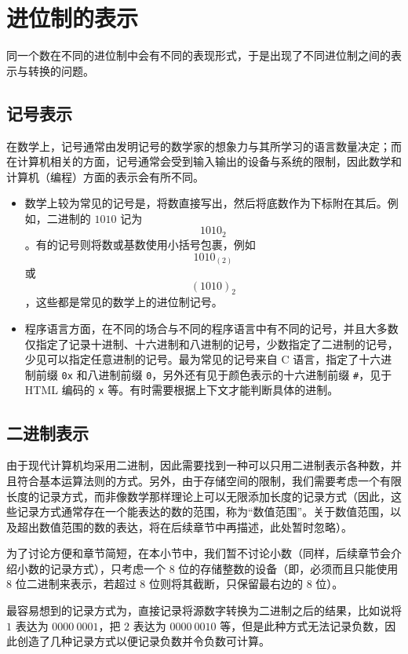 \section{进位制的表示}\label{sec:NumberSystemBasics/positional-notation-presentation}
    同一个数在不同的进位制中会有不同的表现形式，于是出现了不同进位制之间的表示与转换的问题。
    \subsection{记号表示}\label{subsec:NumberSystemBasics/positional-notation-presentation/natural}
        在数学上，记号通常由发明记号的数学家的想象力与其所学习的语言数量决定；而在计算机相关的方面，记号通常会受到输入输出的设备与系统的限制，因此数学和计算机（编程）方面的表示会有所不同。
        \begin{itemize}
            \item 数学上较为常见的记号是，将数直接写出，然后将底数作为下标附在其后。例如，二进制的 $1010$ 记为\[1010_2\]。有的记号则将数或基数使用小括号包裹，例如\[1010_{(2)}\]或\[(1010)_2\]，这些都是常见的数学上的进位制记号。
            \item 程序语言方面，在不同的场合与不同的程序语言中有不同的记号，并且大多数仅指定了记录十进制、十六进制和八进制的记号，少数指定了二进制的记号，少见可以指定任意进制的记号。最为常见的记号来自 C 语言，指定了十六进制前缀 \texttt{0x} 和八进制前缀 \texttt{0}，另外还有见于颜色表示的十六进制前缀 \texttt{\#}，见于 HTML 编码的 \texttt{x} 等。有时需要根据上下文才能判断具体的进制。
        \end{itemize}
    \subsection{二进制表示}\label{subsec:NumberSystemBasics/positional-notation-presentation/binary}
        由于现代计算机均采用二进制，因此需要找到一种可以只用二进制表示各种数，并且符合基本运算法则的方式。另外，由于存储空间的限制，我们需要考虑一个有限长度的记录方式，而非像数学那样理论上可以无限添加长度的记录方式（因此，这些记录方式通常存在一个能表达的数的范围，称为“数值范围”。关于数值范围，以及超出数值范围的数的表达，将在后续章节中再描述，此处暂时忽略）。

        为了讨论方便和章节简短，在本小节中，我们暂不讨论小数（同样，后续章节会介绍小数的记录方式），只考虑一个 $8$ 位的存储整数的设备（即，必须而且只能使用 $8$ 位二进制来表示，若超过 $8$ 位则将其截断，只保留最右边的 $8$ 位）。

        最容易想到的记录方式为，直接记录将源数字转换为二进制之后的结果，比如说将 $1$ 表达为 $0000\ 0001$，把 $2$ 表达为 $0000\ 0010$ 等，但是此种方式无法记录负数，因此创造了几种记录方式以便记录负数并令负数可计算。

